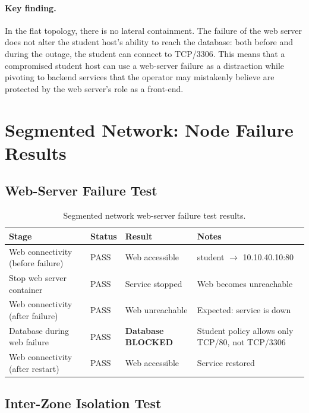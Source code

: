 \paragraph{Key finding.} In the flat topology, there is no lateral containment. The failure of the web server does not alter the student host's ability to reach the database: both before and during the outage, the student can connect to TCP/3306. This means that a compromised student host can use a web-server failure as a distraction while pivoting to backend services that the operator may mistakenly believe are protected by the web server's role as a front-end.

\section{Segmented Network: Node Failure Results}

\subsection{Web-Server Failure Test}

\begin{table}[H]
\centering
\caption[Segmented network web-server failure results]{Segmented network web-server failure test results.}
\label{tab:node-seg-web}
\begin{tabularx}{\textwidth}{l l X X}
\toprule
\textbf{Stage} & \textbf{Status} & \textbf{Result} & \textbf{Notes} \\
\midrule
Web connectivity (before failure) & PASS & Web accessible & student $\rightarrow$ 10.10.40.10:80 \\
Stop web server container & PASS & Service stopped & Web becomes unreachable \\
Web connectivity (after failure) & PASS & Web unreachable & Expected: service is down \\
Database during web failure & PASS & \textbf{Database BLOCKED} & Student policy allows only TCP/80, not TCP/3306 \\
Web connectivity (after restart) & PASS & Web accessible & Service restored \\
\bottomrule
\end{tabularx}
\end{table}

\subsection{Inter-Zone Isolation Test}

